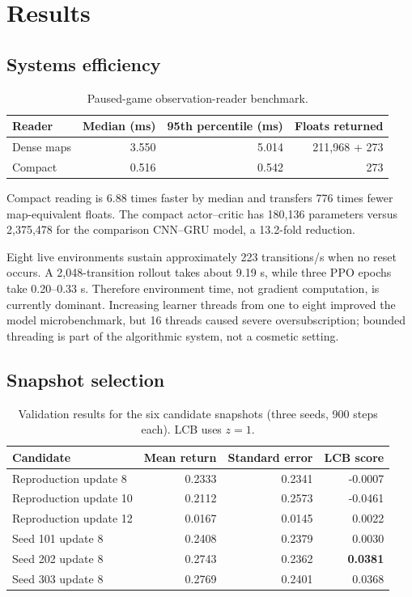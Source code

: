 \documentclass[10pt]{article}
\begin{document}
\section{Results}

\subsection{Systems efficiency}

\begin{table}[ht]
  \centering
  \caption{Paused-game observation-reader benchmark.}
  \label{tab:reader}
  \begin{tabular}{lrrr}
    \toprule
    Reader & Median (ms) & 95th percentile (ms) & Floats returned \\
    \midrule
    Dense maps & 3.550 & 5.014 & 211,968 + 273 \\
    Compact & 0.516 & 0.542 & 273 \\
    \bottomrule
  \end{tabular}
\end{table}

Compact reading is 6.88 times faster by median and transfers 776 times fewer
map-equivalent floats.  The compact actor--critic has 180,136 parameters versus
2,375,478 for the comparison CNN--GRU model, a 13.2-fold reduction.

Eight live environments sustain approximately 223 transitions/s when no reset
occurs.  A 2,048-transition rollout takes about 9.19 s, while three PPO epochs
take 0.20--0.33 s.  Therefore environment time, not gradient computation, is
currently dominant.  Increasing learner threads from one to eight improved the
model microbenchmark, but 16 threads caused severe oversubscription; bounded
threading is part of the algorithmic system, not a cosmetic setting.

\subsection{Snapshot selection}

\begin{table}[ht]
  \centering
  \caption{Validation results for the six candidate snapshots (three seeds,
  900 steps each).  LCB uses $z=1$.}
  \label{tab:selection}
  \begin{tabular}{lrrr}
    \toprule
    Candidate & Mean return & Standard error & LCB score \\
    \midrule
    Reproduction update 8 & 0.2333 & 0.2341 & -0.0007 \\
    Reproduction update 10 & 0.2112 & 0.2573 & -0.0461 \\
    Reproduction update 12 & 0.0167 & 0.0145 & 0.0022 \\
    Seed 101 update 8 & 0.2408 & 0.2379 & 0.0030 \\
    Seed 202 update 8 & 0.2743 & 0.2362 & \textbf{0.0381} \\
    Seed 303 update 8 & 0.2769 & 0.2401 & 0.0368 \\
    \bottomrule
  \end{tabular}
\end{table}
\end{document}
